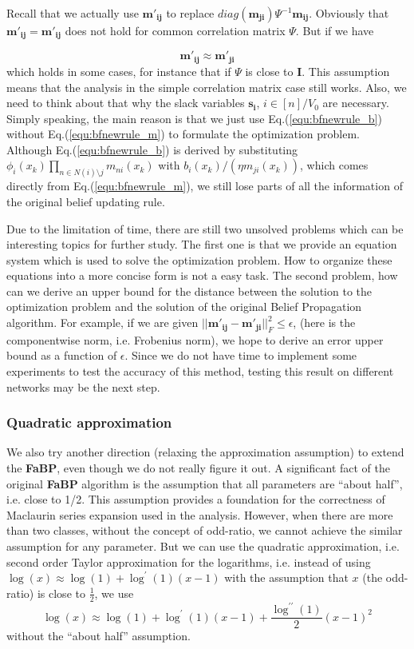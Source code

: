 Recall that we actually use $\mathbf{m'_{ij}}$ to replace $diag(\mathbf{m_{ji}})\Psi^{-1} \mathbf{m_{ij}}$. Obviously that $\mathbf{m'_{ij}} = \mathbf{m'_{ij}}$ does not hold for common correlation matrix $\Psi$. But if we have

$$\mathbf{m'_{ij}} \approx \mathbf{m'_{ji}}$$
which holds in some cases, for instance that if $\Psi$ is close to $\mathbf{I}$. This assumption means that the analysis in the simple correlation matrix case still works. Also, we need to think about that why the slack variables $\mathbf{s_i}$, $i\in [n]/V_0$ are necessary. Simply speaking, the main reason is that we just use Eq.(\ref{equ:bfnewrule_b}) without Eq.(\ref{equ:bfnewrule_m}) to formulate the optimization problem. Although Eq.(\ref{equ:bfnewrule_b}) is derived by substituting $\phi_i(x_k)\prod_{n\in N(i)\setminus j} m_{ni}(x_k)$ with $b_i(x_k)/(\eta m_{ji}(x_k))$, which comes directly from Eq.(\ref{equ:bfnewrule_m}), we still lose parts of all the information of the original belief updating rule.

Due to the limitation of time, there are still two unsolved problems which can be interesting topics for further study. The first one is that we provide an equation system which is used to solve the optimization problem. How to organize these equations into a more concise form is not a easy task. The second problem, how can we derive an upper bound for the distance between the solution to the optimization problem and the solution of the original Belief Propagation algorithm. For example, if we are given $||\mathbf{m'_{ij}} - \mathbf{m'_{ji}}||_F^2 \leq \epsilon$, (here is the componentwise norm, i.e. Frobenius norm), we hope to derive an error upper bound as a function of $\epsilon$. Since we do not have time to implement some experiments to test the accuracy of this method, testing this result on different networks may be the next step.

\subsubsection{Quadratic approximation}
We also try another direction (relaxing the approximation assumption) to extend the \textbf{FaBP}, even though we do not really figure it out. A significant fact of the original \textbf{FaBP} algorithm is the assumption that all parameters are ``about half'', i.e. close to 1/2. This assumption provides a foundation for the correctness of Maclaurin series expansion used in the analysis. However, when there are more than two classes, without the concept of odd-ratio, we cannot achieve the similar assumption for any parameter. But we can use the quadratic approximation, i.e. second order Taylor approximation for the logarithms, i.e. instead of using $\log(x) \approx \log(1)+\log^{\prime}(1)(x-1)$ with the assumption that $x$ (the odd-ratio) is close to $\frac{1}{2}$, we use
$$\log(x)\approx \log(1)+\log^{\prime}(1)(x-1)+\frac{\log^{\prime\prime}(1)}{2}(x-1)^2$$
without the ``about half'' assumption.


